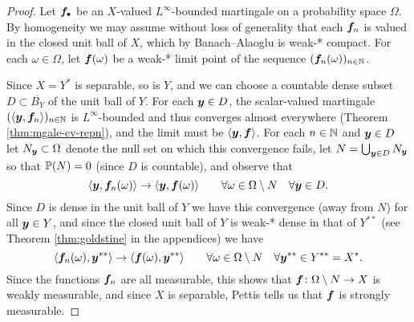 \begin{proof}
  Let $\mb{f}_{\bullet}$ be an $X$-valued $L^\infty$-bounded martingale on a probability space $\Omega$.
  By homogeneity we may assume without loss of generality that each $\mb{f}_n$ is valued in the closed unit ball of $X$, which by Banach--Alaoglu is weak-* compact.
  For each $\omega \in \Omega$, let $\mb{f}(\omega)$ be a weak-* limit point of the sequence $(\mb{f}_n(\omega))_{n \in \N}$.
  
  Since $X = Y^*$ is separable, so is $Y$, and we can choose a countable dense subset $D \subset \overline{B_{Y}}$ of the unit ball of $Y$.
  For each $\mb{y} \in D$, the scalar-valued martingale $(\langle \mb{y}, \mb{f}_n \rangle)_{n \in \N}$ is $L^\infty$-bounded and thus converges almost everywhere (Theorem \ref{thm:mgale-cv-repn}), and the limit must be $\langle \mb{y}, \mb{f} \rangle$.
  For each $n \in \N$ and $\mb{y} \in D$ let $N_{\mb{y}} \subset \Omega$ denote the null set on which this convergence fails, let $N = \bigcup_{\mb{y} \in D} N_{\mb{y}}$ so that $\P(N) = 0$ (since $D$ is countable), and observe that
  \begin{equation*}
    \langle \mb{y}, \mb{f}_n(\omega) \rangle \to \langle \mb{y}, \mb{f}(\omega) \rangle \qquad \forall \omega \in \Omega \sm N \quad \forall \mb{y} \in D.
  \end{equation*}
  Since $D$ is dense in the unit ball of $Y$ we have this convergence (away from $N$) for all $\mb{y} \in Y$, and since the closed unit ball of $Y$ is weak-* dense in that of $Y^{**}$ (see Theorem \ref{thm:goldstine} in the appendices) we have
    \begin{equation*}
      \langle \mb{f}_n(\omega), \mb{y}^{**} \rangle \to \langle \mb{f}(\omega), \mb{y}^{**} \rangle \qquad \forall \omega \in \Omega \sm N \quad \forall \mb{y}^{**} \in Y^{**} = X^{*}.
  \end{equation*}
  Since the functions $\mb{f}_n$ are all measurable, this shows that $\map{\mb{f}}{\Omega \sm N}{X}$ is weakly measurable, and since $X$ is separable, Pettis tells us that $\mb{f}$ is strongly measurable.


\end{proof}

